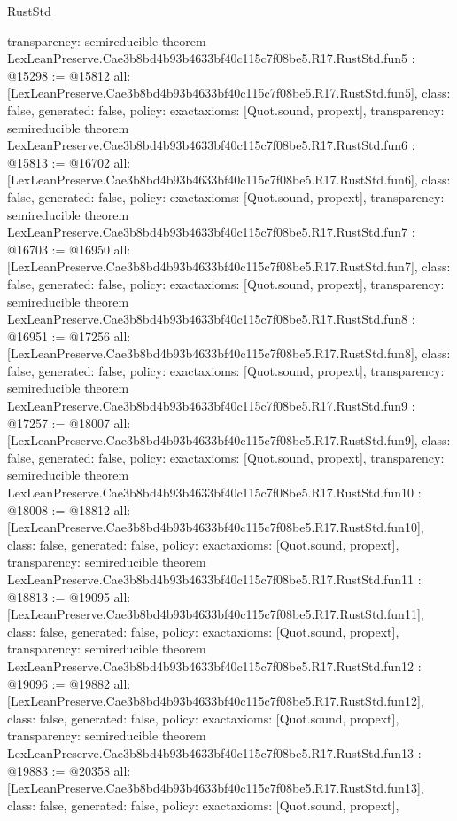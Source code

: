 \begin{lexlean}{RustStd}
\begin{coremodule}
{  transparency: semireducible
}
theorem LexLeanPreserve.Cae3b8bd4b93b4633bf40c115c7f08be5.R17.RustStd.fun5 : @15298 := @15812 {
  all: [LexLeanPreserve.Cae3b8bd4b93b4633bf40c115c7f08be5.R17.RustStd.fun5],
  class: false,
  generated: false,
  policy: exact{axioms: [Quot.sound, propext]},
  transparency: semireducible
}
theorem LexLeanPreserve.Cae3b8bd4b93b4633bf40c115c7f08be5.R17.RustStd.fun6 : @15813 := @16702 {
  all: [LexLeanPreserve.Cae3b8bd4b93b4633bf40c115c7f08be5.R17.RustStd.fun6],
  class: false,
  generated: false,
  policy: exact{axioms: [Quot.sound, propext]},
  transparency: semireducible
}
theorem LexLeanPreserve.Cae3b8bd4b93b4633bf40c115c7f08be5.R17.RustStd.fun7 : @16703 := @16950 {
  all: [LexLeanPreserve.Cae3b8bd4b93b4633bf40c115c7f08be5.R17.RustStd.fun7],
  class: false,
  generated: false,
  policy: exact{axioms: [Quot.sound, propext]},
  transparency: semireducible
}
theorem LexLeanPreserve.Cae3b8bd4b93b4633bf40c115c7f08be5.R17.RustStd.fun8 : @16951 := @17256 {
  all: [LexLeanPreserve.Cae3b8bd4b93b4633bf40c115c7f08be5.R17.RustStd.fun8],
  class: false,
  generated: false,
  policy: exact{axioms: [Quot.sound, propext]},
  transparency: semireducible
}
theorem LexLeanPreserve.Cae3b8bd4b93b4633bf40c115c7f08be5.R17.RustStd.fun9 : @17257 := @18007 {
  all: [LexLeanPreserve.Cae3b8bd4b93b4633bf40c115c7f08be5.R17.RustStd.fun9],
  class: false,
  generated: false,
  policy: exact{axioms: [Quot.sound, propext]},
  transparency: semireducible
}
theorem LexLeanPreserve.Cae3b8bd4b93b4633bf40c115c7f08be5.R17.RustStd.fun10 : @18008 := @18812 {
  all: [LexLeanPreserve.Cae3b8bd4b93b4633bf40c115c7f08be5.R17.RustStd.fun10],
  class: false,
  generated: false,
  policy: exact{axioms: [Quot.sound, propext]},
  transparency: semireducible
}
theorem LexLeanPreserve.Cae3b8bd4b93b4633bf40c115c7f08be5.R17.RustStd.fun11 : @18813 := @19095 {
  all: [LexLeanPreserve.Cae3b8bd4b93b4633bf40c115c7f08be5.R17.RustStd.fun11],
  class: false,
  generated: false,
  policy: exact{axioms: [Quot.sound, propext]},
  transparency: semireducible
}
theorem LexLeanPreserve.Cae3b8bd4b93b4633bf40c115c7f08be5.R17.RustStd.fun12 : @19096 := @19882 {
  all: [LexLeanPreserve.Cae3b8bd4b93b4633bf40c115c7f08be5.R17.RustStd.fun12],
  class: false,
  generated: false,
  policy: exact{axioms: [Quot.sound, propext]},
  transparency: semireducible
}
theorem LexLeanPreserve.Cae3b8bd4b93b4633bf40c115c7f08be5.R17.RustStd.fun13 : @19883 := @20358 {
  all: [LexLeanPreserve.Cae3b8bd4b93b4633bf40c115c7f08be5.R17.RustStd.fun13],
  class: false,
  generated: false,
  policy: exact{axioms: [Quot.sound, propext]},
}
\end{coremodule}
\end{lexlean}
